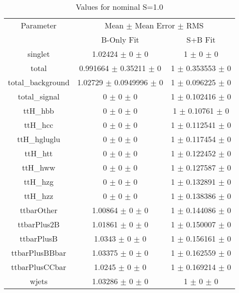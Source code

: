 \begin{table}
\centering
\caption{Values for nominal S=1.0}
\begin{tabular}{ccc}
\toprule
Parameter & \multicolumn{2}{c}{Mean $\pm$ Mean Error $\pm$ RMS}\\
 & B-Only Fit & S+B Fit\\
\midrule
singlet & \num{1.02424} $\pm$ \num{0} $\pm$ \num{0} & \num{1} $\pm$ \num{0} $\pm$ \num{0}\\
total & \num{0.991664} $\pm$ \num{0.35211} $\pm$ \num{0} & \num{1} $\pm$ \num{0.353553} $\pm$ \num{0}\\
total\_background & \num{1.02729} $\pm$ \num{0.0949996} $\pm$ \num{0} & \num{1} $\pm$ \num{0.096225} $\pm$ \num{0}\\
total\_signal & \num{0} $\pm$ \num{0} $\pm$ \num{0} & \num{1} $\pm$ \num{0.102416} $\pm$ \num{0}\\
ttH\_hbb & \num{0} $\pm$ \num{0} $\pm$ \num{0} & \num{1} $\pm$ \num{0.10761} $\pm$ \num{0}\\
ttH\_hcc & \num{0} $\pm$ \num{0} $\pm$ \num{0} & \num{1} $\pm$ \num{0.112541} $\pm$ \num{0}\\
ttH\_hgluglu & \num{0} $\pm$ \num{0} $\pm$ \num{0} & \num{1} $\pm$ \num{0.117454} $\pm$ \num{0}\\
ttH\_htt & \num{0} $\pm$ \num{0} $\pm$ \num{0} & \num{1} $\pm$ \num{0.122452} $\pm$ \num{0}\\
ttH\_hww & \num{0} $\pm$ \num{0} $\pm$ \num{0} & \num{1} $\pm$ \num{0.127587} $\pm$ \num{0}\\
ttH\_hzg & \num{0} $\pm$ \num{0} $\pm$ \num{0} & \num{1} $\pm$ \num{0.132891} $\pm$ \num{0}\\
ttH\_hzz & \num{0} $\pm$ \num{0} $\pm$ \num{0} & \num{1} $\pm$ \num{0.138386} $\pm$ \num{0}\\
ttbarOther & \num{1.00864} $\pm$ \num{0} $\pm$ \num{0} & \num{1} $\pm$ \num{0.144086} $\pm$ \num{0}\\
ttbarPlus2B & \num{1.01861} $\pm$ \num{0} $\pm$ \num{0} & \num{1} $\pm$ \num{0.150007} $\pm$ \num{0}\\
ttbarPlusB & \num{1.0343} $\pm$ \num{0} $\pm$ \num{0} & \num{1} $\pm$ \num{0.156161} $\pm$ \num{0}\\
ttbarPlusBBbar & \num{1.03375} $\pm$ \num{0} $\pm$ \num{0} & \num{1} $\pm$ \num{0.162559} $\pm$ \num{0}\\
ttbarPlusCCbar & \num{1.0245} $\pm$ \num{0} $\pm$ \num{0} & \num{1} $\pm$ \num{0.169214} $\pm$ \num{0}\\
wjets & \num{1.03286} $\pm$ \num{0} $\pm$ \num{0} & \num{1} $\pm$ \num{0} $\pm$ \num{0}\\
\bottomrule
\end{tabular}
\end{table}